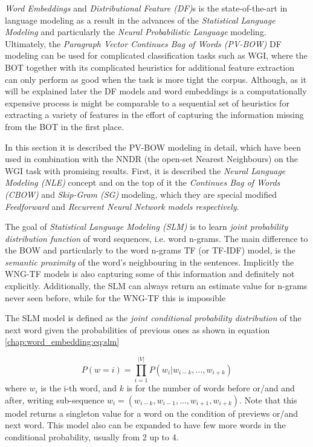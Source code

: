 \textit{Word Embeddings} and \textit{Distributional Feature (DF)}s is the state-of-the-art in language modeling as a result in the advances of the \textit{Statistical Language Modeling} and particularly the \textit{Neural Probabilistic Language} modeling. Ultimately, the \textit{Paragraph Vector Continues Bag of Words (PV-BOW)} DF modeling can be used for complicated classification tasks such as WGI, where the BOT together with its complicated heuristics for additional feature extraction can only perform as good when the task is more tight the corpus. Although, as it will be explained later the DF models and word embeddings is a computationally expensive process is might be comparable to a sequential set of heuristics for extracting a variety of features in the effort of capturing the information missing from the BOT in the first place.  

In this section it is described the PV-BOW modeling in detail, which have been used in combination with the NNDR (the open-set Nearest Neighbours) on the WGI task with promising results. First, it is described the \textit{Neural Language Modeling (NLE)} concept and on the top of it the \textit{Continues Bag of Words  (CBOW)} and  \textit{Skip-Gram (SG)} modeling, which they are special modified \textit{Feedforward} and \textit{Recurrent Neural Network models respectively}.

The goal of \textit{Statistical Language Modeling (SLM) } is to learn \textit{joint probability distribution function} of word sequences, i.e. word n-grams. The main difference to the BOW and particularly to the word n-grams TF (or TF-IDF) model, is the \textit{semantic proximity} of the word's neighbouring in the sentences. Implicitly the WNG-TF models is also capturing some of this information and definitely not explicitly. Additionally, the SLM can always return an estimate value for n-grams never seen before, while for the WNG-TF this is impossible  \parencite{bengio2003neural}

The SLM model is defined as the \textit{joint conditional probability distribution} of the next word given the probabilities of previous ones as shown in equation \ref{chap:word_embedding:eq:slm}

\begin{equation} \label{chap:word_embedding:eq:slm}
	P(w = i) = \prod_{i=1}^{|V|} P(w_{i}|w_{i-k}, ... , w_{i+k})
\end{equation}
\noindent
where $w_{i}$ is the i-th word, and $k$ is for the number of words before or/and and after, writing sub-sequence $w_{i} = (w_{i-k}, w_{i-1}, ... ,w_{i+1}, w_{i+k})$. Note that this model returns a singleton value for a word on the condition of previews or/and next word. This model also can be expanded to have few more words in the conditional probability, usually from 2 up to 4. 

